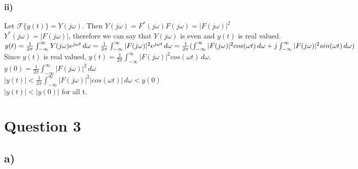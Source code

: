 \documentclass[12pt]{article}
\begin{document}
    \subsubsection*{ii)}
    Let \(\mathscr{F}\{y(t)\} = Y(j\omega)\). Then \(Y(j\omega) = F^*(j\omega)F(j\omega) = |F(j\omega)|^2\)\\
    \(Y^*(j\omega) = |F(j\omega)|\), therefore we can say that \(Y(j\omega)\) is even and \(y(t)\) is real valued.\\
    \begin{math}
      y(t) = \frac{1}{2\pi} \int_{-\infty}^{\infty} Y(j\omega)e^{j\omega t} \,d\omega\\
      = \frac{1}{2\pi} \int_{-\infty}^{\infty} |F(j\omega)|^2e^{j\omega t} \,d\omega\\
      = \frac{1}{2\pi}(\int_{-\infty}^{\infty} |F(j\omega)|^2cos(\omega t) \,d\omega + j\int_{-\infty}^{\infty} |F(j\omega)|^2sin(\omega t) \,d\omega)
    \end{math}\\
    Since \(y(t)\) is real valued, \(y(t) = \frac{1}{2\pi}\int_{-\infty}^{\infty} |F(j\omega)|^2cos(\omega t) \,d\omega\).\\
    \(y(0) = \frac{1}{2\pi}\int_{-\infty}^{\infty} |F(j\omega)|^2 \,d\omega\)\\
    \(|y(t)| < \frac{1}{2\pi}\int_{-\infty}^{\infty} |F(j\omega)|^2|cos(\omega t)| \,d\omega < y(0)\)\\
    \(|y(t)| < |y(0)|\) for all t.
    \section*{Question 3}
    \subsection*{a)}
\end{document}
